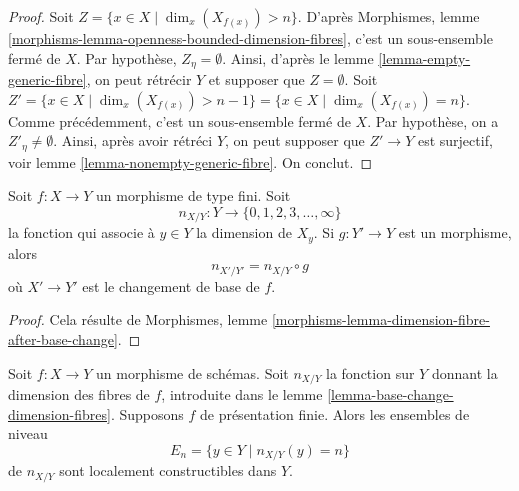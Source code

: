 \begin{proof}
Soit $Z = \{x \in X \mid \dim_x(X_{f(x)}) > n \}$. D'après
Morphismes, lemme \ref{morphisms-lemma-openness-bounded-dimension-fibres},
c'est un sous-ensemble fermé de $X$. Par hypothèse, $Z_\eta = \emptyset$.
Ainsi, d'après le
lemme \ref{lemma-empty-generic-fibre},
on peut rétrécir $Y$ et supposer que $Z = \emptyset$. Soit
$Z' = \{x \in X \mid \dim_x(X_{f(x)}) > n - 1 \} =
\{x \in X \mid \dim_x(X_{f(x)}) = n\}$. Comme précédemment, c'est un sous-ensemble fermé
de $X$. Par hypothèse, on a $Z'_\eta \not = \emptyset$. Ainsi, après
avoir rétréci $Y$, on peut supposer que $Z' \to Y$ est surjectif, voir
lemme \ref{lemma-nonempty-generic-fibre}.
On conclut.
\end{proof}

\begin{lemma}
\label{lemma-base-change-dimension-fibres}
Soit $f : X \to Y$ un morphisme de type fini. Soit
$$
n_{X/Y} : Y \to \{0, 1, 2, 3, \ldots, \infty\}
$$
la fonction qui associe à $y \in Y$ la dimension de $X_y$.
Si $g : Y' \to Y$ est un morphisme, alors
$$
n_{X'/Y'} = n_{X/Y} \circ g
$$
où $X' \to Y'$ est le changement de base de $f$.
\end{lemma}

\begin{proof}
Cela résulte de
Morphismes, lemme \ref{morphisms-lemma-dimension-fibre-after-base-change}.
\end{proof}

\begin{lemma}
\label{lemma-dimension-fibres-constructible}
Soit $f : X \to Y$ un morphisme de schémas. Soit
$n_{X/Y}$ la fonction sur $Y$ donnant la dimension des fibres de $f$,
introduite dans le
lemme \ref{lemma-base-change-dimension-fibres}.
Supposons $f$ de présentation finie. Alors les ensembles de niveau
$$
E_n = \{y \in Y \mid n_{X/Y}(y) = n\}
$$
de $n_{X/Y}$ sont localement constructibles dans $Y$.
\end{lemma}

